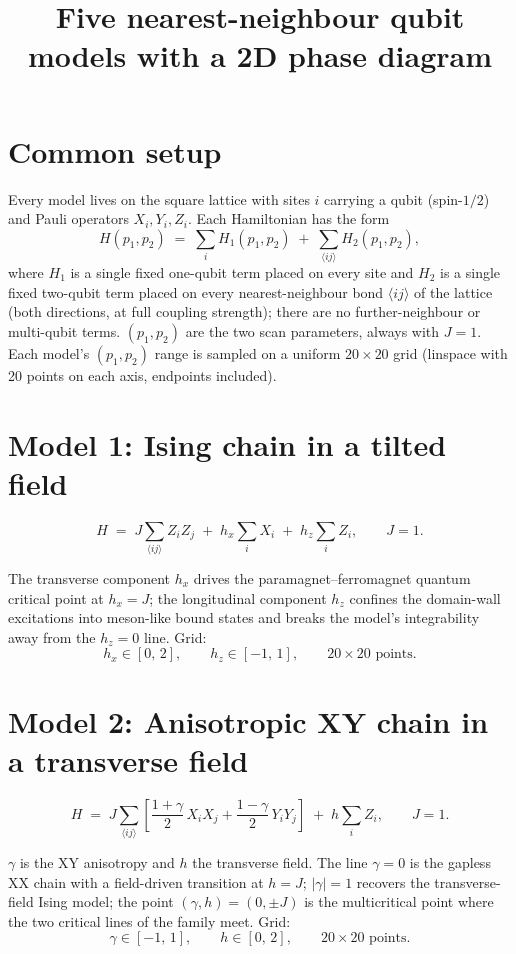 \documentclass[11pt]{article}
\title{Five nearest-neighbour qubit models with a 2D phase diagram}
\author{}
\date{}
\newcommand{\X}{X}
\newcommand{\Y}{Y}
\newcommand{\Z}{Z}
\begin{document}
\maketitle

\section{Common setup}

Every model lives on the square lattice with sites $i$ carrying a qubit
(spin-$1/2$) and Pauli operators $X_i, Y_i, Z_i$. Each Hamiltonian has the
form
\[
  H(p_1,p_2) \;=\; \sum_{i} H_1(p_1,p_2) \;+\; \sum_{\langle ij\rangle} H_2(p_1,p_2),
\]
where $H_1$ is a single fixed one-qubit term placed on every site and $H_2$
is a single fixed two-qubit term placed on every nearest-neighbour bond
$\langle ij\rangle$ of the lattice (both directions, at full coupling
strength); there are no further-neighbour or multi-qubit terms. $(p_1,p_2)$
are the two scan parameters, always with $J=1$. Each model's $(p_1,p_2)$
range is sampled on a uniform $20\times 20$ grid (linspace with 20 points on
each axis, endpoints included).

\section{Model 1: Ising chain in a tilted field}

\[
  H \;=\; J \sum_{\langle ij\rangle} \Z_i \Z_j \;+\; h_x \sum_i \X_i \;+\; h_z \sum_i \Z_i,
  \qquad J = 1 .
\]

The transverse component $h_x$ drives the paramagnet--ferromagnet quantum
critical point at $h_x = J$; the longitudinal component $h_z$ confines the
domain-wall excitations into meson-like bound states and breaks the model's
integrability away from the $h_z=0$ line. Grid:
\[
  h_x \in [0,\,2], \qquad h_z \in [-1,\,1], \qquad 20\times20 \text{ points}.
\]

\section{Model 2: Anisotropic XY chain in a transverse field}

\[
  H \;=\; J \sum_{\langle ij\rangle}
    \left[ \frac{1+\gamma}{2}\, \X_i \X_j + \frac{1-\gamma}{2}\, \Y_i \Y_j \right]
    \;+\; h \sum_i \Z_i,
  \qquad J = 1 .
\]

$\gamma$ is the XY anisotropy and $h$ the transverse field. The line
$\gamma = 0$ is the gapless XX chain with a field-driven transition at
$h = J$; $|\gamma| = 1$ recovers the transverse-field Ising model; the point
$(\gamma,h) = (0, \pm J)$ is the multicritical point where the two critical
lines of the family meet. Grid:
\[
  \gamma \in [-1,\,1], \qquad h \in [0,\,2], \qquad 20\times20 \text{ points}.
\]
\end{document}
